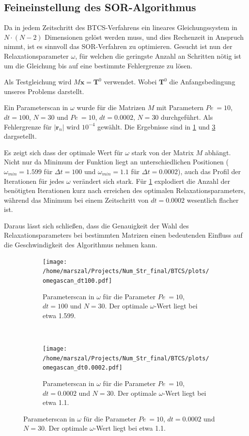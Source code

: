\subsection{Feineinstellung des SOR-Algorithmus}
Da in jedem Zeitschritt des BTCS-Verfahrens ein lineares Gleichungssystem in $N\cdot(N-2)$ Dimensionen gelöst werden muss, und dies Rechenzeit in Anspruch nimmt, ist es sinnvoll das SOR-Verfahren zu optimieren.
Gesucht ist nun der Relaxationsparameter $\omega$, für welchen die geringste Anzahl an Schritten nötig ist um die Gleichung bis auf eine bestimmte Fehlergrenze zu lösen.

Als Testgleichung wird $M\boldsymbol x = \boldsymbol T^0$ verwendet. Wobei $\boldsymbol T^0$ die Anfangsbedingung unseres Problems darstellt.

Ein Parameterscan in $\omega$ wurde für die Matrizen $M$ mit Parametern $Pe~=10$, $dt=100$, $N=30$ und $Pe~=10$, $dt=0.0002$, $N=30$ durchgeführt. Als Fehlergrenze für $|\boldsymbol r_n|$ wird $10^{-4}$ gewählt.
Die Ergebnisse sind in \cref{fig:parscan100} und \cref{fig:parscan000} dargsetellt.

Es zeigt sich dass der optimale Wert für $\omega$ stark von der Matrix $M$ abhängt.
Nicht nur da Minimum der Funktion liegt an unterschiedlichen Positionen ($\omega_{min}=1.599$ für $\Delta t=100$ und $\omega_{min}=1.1$ für $\Delta t=0.0002$), auch das Profil der Iterationen für jedes $\omega$ verändert sich stark. Für \cref{fig:parscan100} explodiert die Anzahl der benötigten Iterationen kurz nach erreichen des optimalen Relaxationsparameters, während das Minimum bei einem Zeitschritt von $dt=0.0002$ wesentlich flacher ist.

Daraus lässt sich schließen, dass die Genauigkeit der Wahl des Relaxationsparameters bei bestimmten Matrizen einen bedeutenden Einfluss auf die Geschwindigkeit des Algorithmus nehmen kann.

\begin{figure}
\centering
\begin{subfigure}[b]{0.45\textwidth}
  \texttt{[image: /home/marszal/Projects/Num\_Str\_final/BTCS/plots/omegascan\_dt100.pdf]}\caption{Parameterscan in $\omega$ für die Parameter $Pe~=10$, $dt=100$ und $N=30$. Der optimale $\omega$-Wert liegt bei etwa 1.599.}\label{fig:parscan100}
\end{subfigure}
~
\begin{subfigure}[b]{0.45\textwidth}
  \texttt{[image: /home/marszal/Projects/Num\_Str\_final/BTCS/plots/omegascan\_dt0.0002.pdf]}\caption{Parameterscan in $\omega$ für die Parameter $Pe~=10$, $dt=0.0002$ und $N=30$. Der optimale $\omega$-Wert liegt bei etwa 1.1.}\label{fig:parscan000}
\end{subfigure}
\end{figure}

